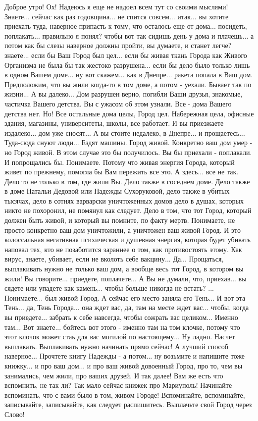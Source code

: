Доброе утро! Ох! Надеюсь я еще не надоел всем тут со своими мыслями! Знаете...
сейчас как раз годовщина... не спится совсем... итак... вы хотите приехать
туда, наверное припасть к тому, что осталось еще от дома... посидеть,
поплакать... правильно я понял? чтобы вот так сидишь день у дома и плачешь... а
потом как бы слезы наверное должны пройти, вы думаете, и станет легче?
знаете... если бы Ваш Город был цел... если бы живая ткань Города как Живого
Организма не была бы так жестоко разрушена... если бы дело было только лишь в
одном Вашем доме... ну вот скажем... как в Днепре... ракета попала в Ваш дом.
Предположим, что вы жили когда-то в том доме, а потом - уехали. Бывает так по
жизни... А вы далеко... Дом разрушен верно, погибли Ваши друзья, знакомые,
частичка Вашего детства. Вы с ужасом об этом узнали. Все - дома Вашего детства
нет. Но! Все остальные дома целы, Город цел. Набережная цела, офисные здания,
магазины, университеты, школы, все работает. И вы приезжаете издалеко... дом
уже сносят... А вы стоите недалеко, в Днепре... и прощаетесь... Туда-сюда снуют
люди... Ездят машины. Город живой. Конкретно ваш дом умер - но Город живой. В
этом случае это бы получилось. Вы бы приехали - поплакали. И попрощались бы.
Понимаете. Потому что живая энергия Города, который живет по прежнему, помогла
бы Вам пережить все это. А здесь... все не так. Дело то не только в том, где
жили Вы. Дело также в соседнем доме. Дело также в доме Натальи Дедовой или
Надежды Сухоруковой, дело также в убитых тысячах, дело в сотнях варварски
уничтоженных домов дело в душах, которых никто не похоронил, не помянул как
следует.  Дело в том, что тот Город, который должен быть живой, и который вы
помните, по факту мертв. Понимаете, не просто конкретно ваш дом уничтожили, а
уничтожен ваш живой Город. И это колоссальная негативная психическая и душевная
энергия, которая будет убивать наповал тех, кто не позаботится зараннее о том,
как противостоять этому. Как вирус, знаете, убивает, если не вколоть себе
вакцину... Да... Прощаться, выплакивать нужно не только ваш дом, а вообще весь
тот Город, в котором вы жили! Вы говорите... приедете, поплачете... А Вы не
думали, что, приехав... вы сядете или упадете как камень... чтобы больше
никогда не встать? ... Понимаете... был живой Город. А сейчас его место заняла
его Тень... И вот эта Тень... да, Тень Города... она ждет вас, да, там на месте
ждет вас... чтобы, когда вы приедете... забрать к себе навсегда, чтобы сожрать
вас целиком... Именно там... Вот знаете... бойтесь вот этого - именно там на
том клочке, потому что этот клочок может стаь для вас могилой по настоящему...
Ну ладно. Насчет выплакать. Выплакивать нужно начинать прямо сейчас! А лучший
способ наверное... Прочтете книгу Надежды - а потом... ну возьмите и напишите
тоже книжку... и про ваш дом... и про ваш живой довоенный Город, про то, чем вы
занимались, чем жили, про ваших друзей. И так далее!  Вам же есть что
вспомнить, не так ли? Так мало сейчас книжек про Мариуполь!  Начинайте
вспоминать, что с вами было в том, живом Городе!  Вспоминайте, вспоминайте,
записывайте, записывайте, как следует распишитесь. Выплачьте свой Город через
Слово!

